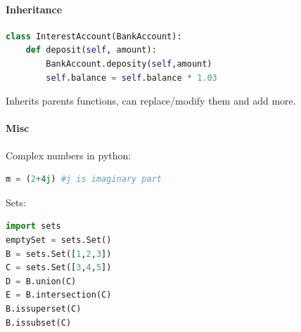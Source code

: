 \documentclass[12 pt]{article}
\begin{document}
\paragraph{Inheritance}
\begin{lstlisting}[language=python]
class InterestAccount(BankAccount):
    def deposit(self, amount):
        BankAccount.deposity(self,amount)
        self.balance = self.balance * 1.03
\end{lstlisting}
Inherits parents functions, can replace/modify them and add more.
\paragraph{Misc}
Complex numbers in python:
\begin{lstlisting}[language=python]
m = (2+4j) #j is imaginary part
\end{lstlisting}
Sets:
\begin{lstlisting}[language=python]
import sets
emptySet = sets.Set()
B = sets.Set([1,2,3])
C = sets.Set([3,4,5])
D = B.union(C)
E = B.intersection(C)
B.issuperset(C)
B.issubset(C)
\end{lstlisting}
\end{document}
